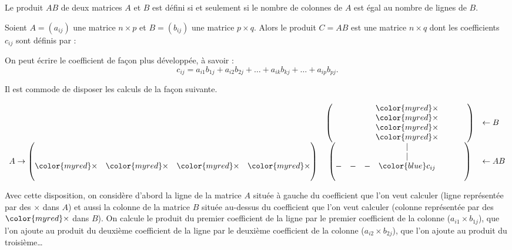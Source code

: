 \documentclass[class=report,crop=false]{standalone}
\begin{document}
Le produit $AB$ de deux matrices $A$ et $B$ est défini si et seulement si le nombre de colonnes de
$A$ est égal au nombre de lignes de $B$.

\begin{definition}
Soient $A=(a_{ij})$ une matrice $n\times p$ et $B=(b_{ij})$ une matrice $p\times q$.
Alors le produit $C=AB$ est une matrice $n\times q$ dont les coefficients $c_{ij}$
sont définis par :

\end{definition}

On peut écrire le coefficient de façon plus développée, à savoir :
$$c_{ij}=a_{i1}b_{1j}+a_{i2}b_{2j}+ \dots +
a_{ik}b_{kj}+ \dots + a_{ip}b_{pj}.$$


Il est commode de disposer les calculs de la
façon suivante.

$$\begin{array}{ccl}
&\begin{pmatrix}
&&&{\color{myred}\times}&&\\
&&&{\color{myred}\times}&&\\
\hphantom{-}&\hphantom{-}&\hphantom{-}&{\color{myred}\times}&\hphantom{-}&\hphantom{-}\\
&&&{\color{myred}\times}&&
\end{pmatrix}&\leftarrow B\\
A\to\begin{pmatrix}
&&&\\
&&&\\
{\color{myred}\times}&{\color{myred}\times}&{\color{myred}\times}&{\color{myred}\times}\\
&&&
\end{pmatrix}
&\begin{pmatrix}
&&&|&&\\
&&&|&&\\
-&-&-&{\color{blue}c_{ij}}&\hphantom{-}&\hphantom{-}\\
&&&&&
\end{pmatrix}&\leftarrow AB\\
\end{array}
$$


Avec cette disposition, on considère d'abord la ligne
de la matrice $A$ située à gauche du coefficient que l'on veut
calculer (ligne représentée par des $\times $ dans $A$)
et aussi la colonne de la matrice $B$ située au-dessus du coefficient
que l'on veut calculer (colonne représentée par des ${\color{myred}\times}$ dans $B$).
On calcule le produit du premier coefficient de la ligne par le premier coefficient
de la colonne ($a_{i1} \times b_{1j}$), que l'on ajoute au produit du deuxième coefficient de la ligne par le deuxième coefficient
de la colonne ($a_{i2} \times b_{2j}$), que l'on ajoute au produit du troisième\ldots
\end{document}
